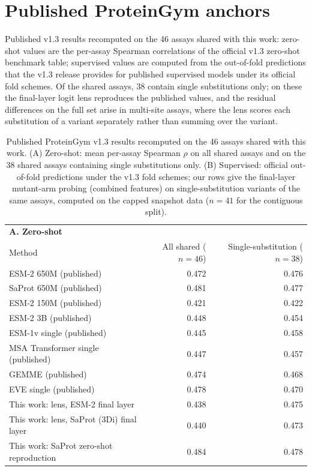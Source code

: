 \documentclass[11pt,a4paper]{article}
\begin{document}
\section*{Published ProteinGym anchors}
Published v1.3 results recomputed on the 46 assays shared with this work: zero-shot values
are the per-assay Spearman correlations of the official v1.3 zero-shot benchmark table;
supervised values are computed from the out-of-fold predictions that the v1.3 release
provides for published supervised models under its official fold schemes. Of the shared
assays, 38 contain single substitutions only; on these the final-layer logit lens
reproduces the published values, and the residual differences on the full set arise in
multi-site assays, where the lens scores each substitution of a variant separately rather
than summing over the variant.
\begin{table}[H]\centering\small
\caption{Published ProteinGym v1.3 results recomputed on the 46 assays shared with this work. (A) Zero-shot: mean per-assay Spearman $\rho$ on all shared assays and on the 38 shared assays containing single substitutions only. (B) Supervised: official out-of-fold predictions under the v1.3 fold schemes; our rows give the final-layer mutant-arm probing (combined features) on single-substitution variants of the same assays, computed on the capped snapshot data ($n = 41$ for the contiguous split).}\label{tab:S11}
\begin{tabular}{lrr}
\toprule
\multicolumn{3}{l}{\textbf{A. Zero-shot}} \\
Method & All shared ($n=46$) & Single-substitution ($n=38$) \\
\midrule
ESM-2 650M (published) & 0.472 & 0.476 \\
SaProt 650M (published) & 0.481 & 0.477 \\
ESM-2 150M (published) & 0.421 & 0.422 \\
ESM-2 3B (published) & 0.448 & 0.454 \\
ESM-1v single (published) & 0.445 & 0.458 \\
MSA Transformer single (published) & 0.447 & 0.457 \\
GEMME (published) & 0.474 & 0.468 \\
EVE single (published) & 0.478 & 0.470 \\
\midrule
This work: lens, ESM-2 final layer & 0.438 & 0.475 \\
This work: lens, SaProt (3Di) final layer & 0.440 & 0.473 \\
This work: SaProt zero-shot reproduction & 0.484 & 0.478 \\

\end{tabular}
\end{table}
\end{document}
